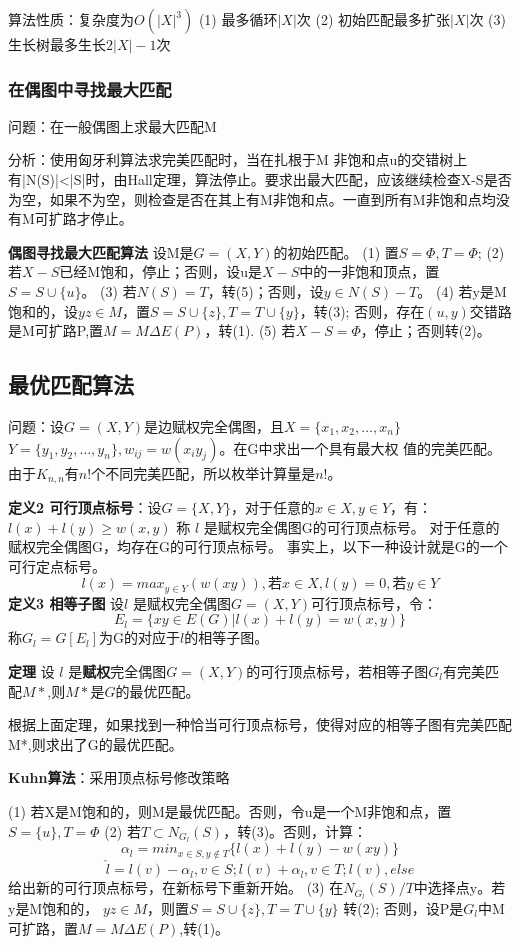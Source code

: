 \documentclass{article}
\begin{document}
算法性质：复杂度为$O(|X|^3)$
(1) 最多循环$|X|$次
(2) 初始匹配最多扩张$|X|$次
(3) 生长树最多生长$2|X|-1$次

\subsubsection{在偶图中寻找最大匹配}

问题：在一般偶图上求最大匹配M

分析：使用匈牙利算法求完美匹配时，当在扎根于M 非饱和点u的交错树上 有|N(S)|<|S|时，由Hall定理，算法停止。要求出最大匹配，应该继续检查X-S是否为空，如果不为空，则检查是否在其上有M非饱和点。一直到所有M非饱和点均没有M可扩路才停止。

\textbf{偶图寻找最大匹配算法}
设M是$G=(X, Y)$的初始匹配。
(1) 置$S=\Phi, T=\Phi$;
(2) 若$X-S$已经M饱和，停止；否则，设u是$X-S$中的一非饱和顶点，置$S=S \cup\{u\}$。
(3) 若$N(S)=T$，转(5)；否则，设$y \in N(S)-T$。
(4) 若y是M饱和的，设$yz \in M$，置$ S=S\cup\{z\}, T=T \cup\{y\}$，转(3); 否则，存在$(u, y)$交错路是M可扩路P,置$M=M\Delta E(P)$，转(1).
(5) 若$X-S=\Phi$，停止；否则转(2)。

\subsection{最优匹配算法}

问题：设$G=(X, Y)$是边赋权完全偶图，且$X=\{x_1, x_2,…,x_n\}$
$Y=\{y_1, y_2,…,y_n\}, w_{ij}=w(x_iy_j)$。在G中求出一个具有最大权
值的完美匹配。由于$K_{n,n}$有$n!$个不同完美匹配，所以枚举计算量是$n!$。

\textbf{定义2 可行顶点标号}：设$G = \{X,Y\}$，对于任意的$x \in X, y \in Y$，有：$l(x)+l(y) \ge w(x,y)$  称 $l$ 是赋权完全偶图G的可行顶点标号。
对于任意的赋权完全偶图G，均存在G的可行顶点标号。
事实上，以下一种设计就是G的一个可行定点标号。
$$
l(x) = max_{y \in Y}(w(xy)), \text{若} x \in X, l(y) = 0, \text{若} y \in Y
$$
\textbf{定义3 相等子图} 设$l$ 是赋权完全偶图$G=(X, Y)$可行顶点标号，令：
$$ E_l = \{xy \in E(G) | l(x) + l(y) = w(x,y)\}$$称$G_l = G [E_l]$为G的对应于$l$的相等子图。

\textbf{定理} 设 $l$ 是\textbf{赋权}完全偶图$G=(X, Y)$的可行顶点标号，若相等子图$G_l$有完美匹配$M*$,则$M*$是$G$的最优匹配。

根据上面定理，如果找到一种恰当可行顶点标号，使得对应的相等子图有完美匹配M*,则求出了G的最优匹配。

\textbf{Kuhn算法}：采用顶点标号修改策略

(1) 若X是M饱和的，则M是最优匹配。否则，令u是一个M非饱和点，置$ S = \{u\}, T = {\Phi}$
(2) 若$T \subset N_{G_l}(S)$，转(3)。否则，计算：
$$\alpha_l = min_{x\in S, y \notin T}\{l(x)+l(y)-w(xy)\}$$
$$ \hat{l} = l(v)-\alpha_l, v \in S;   l(v)+\alpha_l, v \in T;   l(v), else$$
给出新的可行顶点标号，在新标号下重新开始。
(3) 在$N_{G_l}(S)/T$中选择点y。若y是M饱和的， $yz \in M$，则置$S = S \cup \{z\}, T = T \cup \{y\}$ 转(2); 否则，设P是$G_l$中M可扩路，置$M=M\Delta E(P)$,转(1)。
\end{document}
